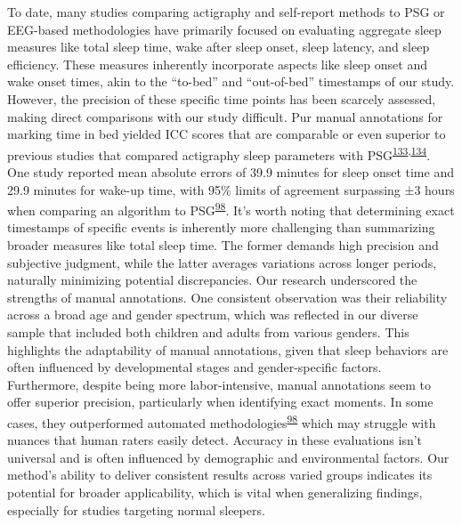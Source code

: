 \documentclass[
  10pt,
]{scrbook}
\begin{document}
To date, many studies comparing actigraphy and self-report methods to
PSG or EEG-based methodologies have primarily focused on evaluating
aggregate sleep measures like total sleep time, wake after sleep onset,
sleep latency, and sleep efficiency. These measures inherently
incorporate aspects like sleep onset and wake onset times, akin to the
``to-bed'' and ``out-of-bed'' timestamps of our study. However, the
precision of these specific time points has been scarcely assessed,
making direct comparisons with our study difficult. Pur manual
annotations for marking time in bed yielded ICC scores that are
comparable or even superior to previous studies that compared actigraphy
sleep parameters with
PSG\textsuperscript{\protect\hyperlink{ref-haghayegh_application_2020}{133},\protect\hyperlink{ref-yavuz-kodat_2019}{134}}.
One study reported mean absolute errors of 39.9 minutes for sleep onset
time and 29.9 minutes for wake-up time, with 95\% limits of agreement
surpassing ±3 hours when comparing an algorithm to
PSG\textsuperscript{\protect\hyperlink{ref-van_hees_estimating_2018}{98}}.
It's worth noting that determining exact timestamps of specific events
is inherently more challenging than summarizing broader measures like
total sleep time. The former demands high precision and subjective
judgment, while the latter averages variations across longer periods,
naturally minimizing potential discrepancies. Our research underscored
the strengths of manual annotations. One consistent observation was
their reliability across a broad age and gender spectrum, which was
reflected in our diverse sample that included both children and adults
from various genders. This highlights the adaptability of manual
annotations, given that sleep behaviors are often influenced by
developmental stages and gender-specific factors. Furthermore, despite
being more labor-intensive, manual annotations seem to offer superior
precision, particularly when identifying exact moments. In some cases,
they outperformed automated
methodologies\textsuperscript{\protect\hyperlink{ref-van_hees_estimating_2018}{98}}
which may struggle with nuances that human raters easily detect.
Accuracy in these evaluations isn't universal and is often influenced by
demographic and environmental factors. Our method's ability to deliver
consistent results across varied groups indicates its potential for
broader applicability, which is vital when generalizing findings,
especially for studies targeting normal sleepers.
\end{document}

